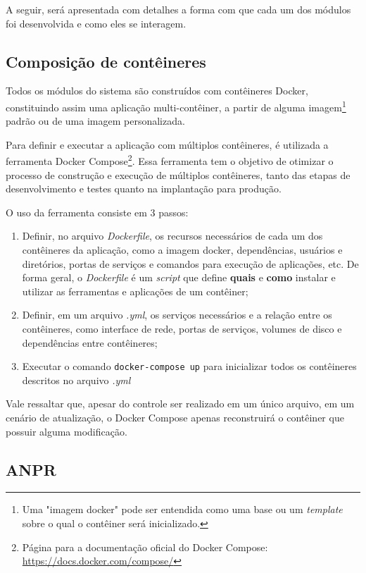 \documentclass[12pt]{article}
\begin{document}
A seguir, será apresentada com detalhes a forma com que cada um dos módulos foi desenvolvida e como eles se interagem.

\subsection{Composição de contêineres}

Todos os módulos do sistema são construídos com contêineres Docker, constituindo assim uma aplicação multi-contêiner, a partir de alguma imagem\footnote{Uma "imagem docker" pode ser entendida como uma base ou um \textit{template} sobre o qual o contêiner será inicializado.} padrão ou de uma imagem personalizada.

Para definir e executar a aplicação com múltiplos contêineres, é utilizada a ferramenta Docker Compose\footnote{Página para a documentação oficial do Docker Compose: \url{https://docs.docker.com/compose/}}. Essa ferramenta tem o objetivo de otimizar o processo de construção e execução de múltiplos contêineres, tanto das etapas de desenvolvimento e testes quanto na implantação para produção.

O uso da ferramenta consiste em 3 passos:

\begin{enumerate}
	\item Definir, no arquivo \textit{Dockerfile}, os recursos necessários de cada um dos contêineres da aplicação, como a imagem docker, dependências, usuários e diretórios, portas de serviços e comandos para execução de aplicações, etc. De forma geral, o \textit{Dockerfile} é um \textit{script} que define \textbf{quais} e \textbf{como} instalar e utilizar as ferramentas e aplicações de um contêiner;
	\item Definir, em um arquivo \textit{.yml}, os serviços necessários e a relação entre os contêineres, como interface de rede, portas de serviços, volumes de disco e dependências entre contêineres;
	\item Executar o comando \texttt{docker-compose up} para inicializar todos os contêineres descritos no arquivo \textit{.yml}
\end{enumerate}

Vale ressaltar que, apesar do controle ser realizado em um único arquivo, em um cenário de atualização, o Docker Compose apenas reconstruirá o contêiner que possuir alguma modificação.

\subsection{ANPR}
\end{document}
